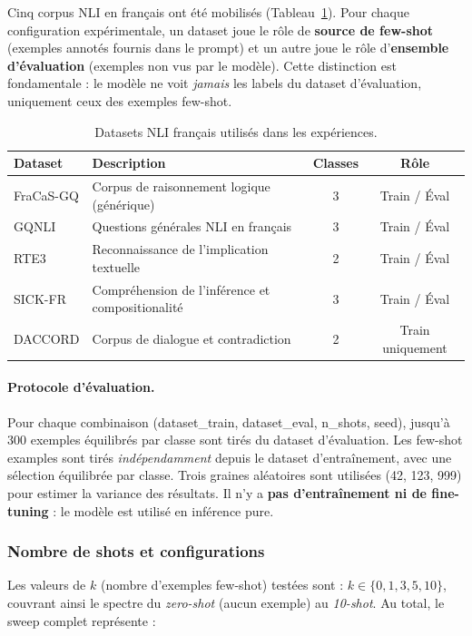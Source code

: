 Cinq corpus NLI en français ont été mobilisés (Tableau~\ref{tab:datasets}). Pour chaque configuration expérimentale, un dataset joue le rôle de \textbf{source de few-shot} (exemples annotés fournis dans le prompt) et un autre joue le rôle d'\textbf{ensemble d'évaluation} (exemples non vus par le modèle). Cette distinction est fondamentale : le modèle ne voit \emph{jamais} les labels du dataset d'évaluation, uniquement ceux des exemples few-shot.

\begin{table}[h]
\centering
\caption{Datasets NLI français utilisés dans les expériences.}
\label{tab:datasets}
\begin{tabular}{llcc}
\toprule
\textbf{Dataset} & \textbf{Description} & \textbf{Classes} & \textbf{Rôle} \\
\midrule
FraCaS-GQ  & Corpus de raisonnement logique (générique) & 3 & Train / Éval \\
GQNLI      & Questions générales NLI en français         & 3 & Train / Éval \\
RTE3       & Reconnaissance de l'implication textuelle   & 2 & Train / Éval \\
SICK-FR    & Compréhension de l'inférence et compositionalité & 3 & Train / Éval \\
DACCORD    & Corpus de dialogue et contradiction         & 2 & Train uniquement \\
\bottomrule
\end{tabular}
\end{table}

\paragraph{Protocole d'évaluation.}
Pour chaque combinaison (dataset\_train, dataset\_eval, n\_shots, seed), jusqu'à 300 exemples équilibrés par classe sont tirés du dataset d'évaluation. Les few-shot examples sont tirés \emph{indépendamment} depuis le dataset d'entraînement, avec une sélection équilibrée par classe. Trois graines aléatoires sont utilisées (42, 123, 999) pour estimer la variance des résultats. Il n'y a \textbf{pas d'entraînement ni de fine-tuning} : le modèle est utilisé en inférence pure.

\subsubsection{Nombre de shots et configurations}

Les valeurs de $k$ (nombre d'exemples few-shot) testées sont : $k \in \{0, 1, 3, 5, 10\}$, couvrant ainsi le spectre du \textit{zero-shot} (aucun exemple) au \textit{10-shot}. Au total, le sweep complet représente :


